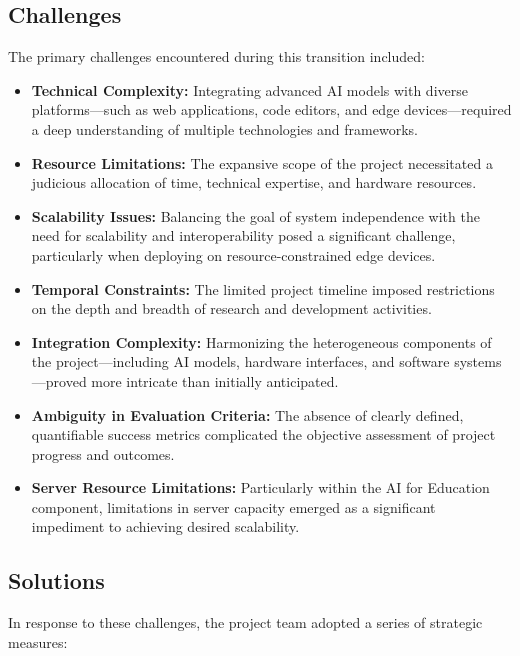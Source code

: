 \subsection{Challenges}

The primary challenges encountered during this transition included:

\begin{itemize}
    \item \textbf{Technical Complexity:} Integrating advanced AI models with diverse platforms—such as web applications, code editors, and edge devices—required a deep understanding of multiple technologies and frameworks.
    \item \textbf{Resource Limitations:} The expansive scope of the project necessitated a judicious allocation of time, technical expertise, and hardware resources.
    \item \textbf{Scalability Issues:} Balancing the goal of system independence with the need for scalability and interoperability posed a significant challenge, particularly when deploying on resource-constrained edge devices.
    \item \textbf{Temporal Constraints:} The limited project timeline imposed restrictions on the depth and breadth of research and development activities.
    \item \textbf{Integration Complexity:} Harmonizing the heterogeneous components of the project—including AI models, hardware interfaces, and software systems—proved more intricate than initially anticipated.
    \item \textbf{Ambiguity in Evaluation Criteria:} The absence of clearly defined, quantifiable success metrics complicated the objective assessment of project progress and outcomes.
    \item \textbf{Server Resource Limitations:} Particularly within the AI for Education component, limitations in server capacity emerged as a significant impediment to achieving desired scalability.
\end{itemize}

\subsection{Solutions}

In response to these challenges, the project team adopted a series of strategic measures:

